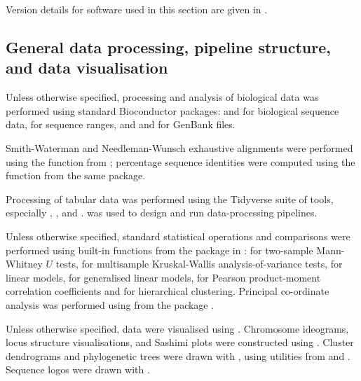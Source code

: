 Version details for software used in this section are given in .

\subsection{General data processing, pipeline structure, and data visualisation}
\label{sec:methods_comp_general}

Unless otherwise specified, processing and analysis of biological data was performed using standard Bioconductor \parencite{huber2015bioconductor} packages:  \parencite{pages2017biostrings} and  \parencite{pages2018bsgenome} for biological sequence data,  \parencite{lawrence2013genomicranges} for sequence ranges, and  \parencite{becker2018genbankr} and  \parencite{winter2017rentrez} for GenBank files. 

Smith-Waterman and Needleman-Wunsch exhaustive alignments \parencite{needleman1970alignment,waterman1981alignment} were performed using the  function from ; percentage sequence identities were computed using the  function from the same package.

Processing of tabular data was performed using the Tidyverse suite of tools, especially  \parencite{wickham2018readr},  \parencite{wickham2018dplyr},  \parencite{wickham2018tidyr} and  \parencite{wickham2018stringr}.  \parencite{koster2012snakemake} was used to design and run data-processing pipelines.

Unless otherwise specified, standard statistical operations and comparisons were performed using built-in functions from the  package in  \parencite{rcore2018rcore}:  for two-sample Mann-Whitney $U$ tests,  for multisample Kruskal-Wallis analysis-of-variance tests,  for linear models,  for generalised linear models,  for Pearson product-moment correlation coefficients and  for hierarchical clustering. Principal co-ordinate analysis was performed using  from the  package \parencite{paradis2018ape}.

Unless otherwise specified, data were visualised using  \parencite{wickham2016ggplot2}. Chromosome ideograms, locus structure visualisations, and Sashimi plots \parencite{katz2013sashimi} were constructed using  \parencite{hahne2016gviz}. Cluster dendrograms and phylogenetic trees were drawn with  \parencite{guangchuang2018ggtree}, using utilities from  \parencite{paradis2018ape} and  \parencite{guangchuang2018tidytree}. Sequence logos were drawn with  \parencite{wagih2017ggseqlogo}. 

